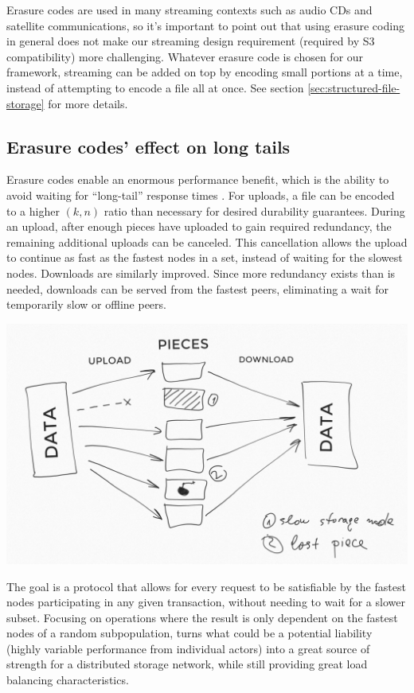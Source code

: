\documentclass[11pt,fleqn,openany]{book}
\begin{document}
Erasure codes are used in many streaming contexts such as audio CDs and
satellite communications, so it's important to point out that using erasure
coding in general does not make our streaming design requirement
(required by S3 compatibility) more challenging.
Whatever erasure code is chosen for our framework, streaming can be
added on top by encoding small portions at a time, instead of attempting to
encode a file all at once. See section \ref{sec:structured-file-storage} for
more details.

\subsection{Erasure codes' effect on long tails}

Erasure codes enable an enormous performance benefit, which is the ability to
avoid waiting for ``long-tail'' response times \cite{tail-at-scale}. For uploads,
a file can be encoded to a higher $(k, n)$ ratio than necessary for desired
durability guarantees.
During an upload, after enough pieces have uploaded to gain required
redundancy, the remaining additional uploads can be canceled. This cancellation allows the
upload to continue as fast as the fastest nodes in a set, instead of waiting
for the slowest nodes.
Downloads are similarly improved. Since more redundancy exists
than is needed, downloads can be served from the fastest peers, eliminating a
wait for temporarily slow or offline peers.

\begin{center}
\includegraphics[width=\textwidth]{diagram-drafts/redundancy.png}
\end{center}

The goal is a protocol that allows for every request to be satisfiable by the
fastest nodes participating in any given transaction, without needing to wait
for a slower subset.
Focusing on operations where the result is only dependent on the fastest
nodes of a random subpopulation, turns what could be a potential liability
(highly variable performance from individual actors) into a great source of
strength for a distributed storage network, while still providing great load
balancing characteristics.
\end{document}
